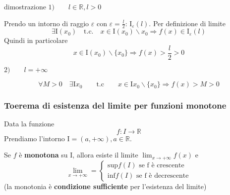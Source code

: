 \documentclass[x11names]{article}
\begin{document}
\begin{es}{dimostrazione}
$1) \qquad l \in \mathbb{R}, l > 0 \qquad $ 

\begin{center}

\end{center}

Prendo un intorno di raggio $\varepsilon$ con $\varepsilon = \frac{l}{2}$: $\text{I}_\varepsilon (l)$. Per definizione di limite
\[
\exists \text{I}(x_0) \quad \text{t.c.} \quad x \in \text{I}(x_0) \backslash x_0 \Longrightarrow f(x) \in \text{I}_\varepsilon (l)
\]
Quindi in particolare 
\[
x \in \text{I}(x_0) \backslash \{x_0\} \Longrightarrow f(x) > \frac{l}{2} > 0
\]

$2) \qquad l = + \infty \qquad$ 
\begin{center}

\end{center}
\[
\forall M > 0 \quad \exists \text{I}{x_0} \qquad \text{t.c} \qquad x \in \text{I}{x_0} \backslash \{x_0\} \Longrightarrow f(x) > M > 0
\]
\end{es}


\begin{center}
\colorbox{myred}{\begin{minipage}{5.75in}
\begin{redes}{}
\subsubsection{Toerema di esistenza del limite per funzioni monotone}
Data la funzione
\[
f: I \rightarrow \mathbb{R}
\]
Prendiamo l'intorno $\text{I} = (a,+\infty), a \in \mathbb{R}$.

Se $f$ è \textbf{monotona} su $\text{I}$, allora esiste il limite $\lim_{x \to +\infty}f(x)$ e 
\[
\lim_{x \to +\infty} = 
\begin{cases}
     \text{sup}f(I) \text{ se f è crescente}  \\
     \text{inf}f(I) \text{ se f è decrescente} 
\end{cases}
\]
(la monotonia è \textbf{condizione sufficiente} per l'esistenza del limite)
\end{redes}
\end{minipage}}        
\end{center}
\end{document}
